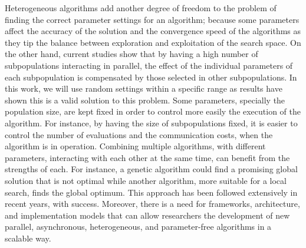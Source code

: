 \documentclass[runningheads]{llncs}
\begin{document}
Heterogeneous algorithms add another degree of freedom to the problem of finding
the correct parameter settings for an algorithm; because some parameters affect
the accuracy of the solution and the convergence speed of the algorithms as they
tip the balance between exploration and exploitation of the search space. On the
other hand, current studies show that by having a high number of subpopulations
interacting in parallel, the effect of the individual parameters of each
subpopulation is compensated by those selected in other subpopulations. In this
work, we will use random settings within a specific range as results have shown
this is a valid solution to this problem. 
Some parameters, specially the population size, are
kept fixed in order to control more easily the execution of the algorithm. For
instance, by having the size of subpopulations fixed, it is easier to control
the number of evaluations and the communication costs, when the algorithm is in
operation.
Combining multiple algorithms, with different parameters, interacting with each
other at the same time, can benefit from the strengths of each. For instance, a
genetic algorithm could find a promising global solution that is not optimal
while another algorithm, more suitable for a local search, finds the global
optimum. This approach has been followed extensively in recent years, with
success. Moreover, there is a need for frameworks, architecture, and
implementation models that can allow researchers the development of new
parallel, asynchronous, heterogeneous, and parameter-free algorithms in a scalable way.  



\end{document}
